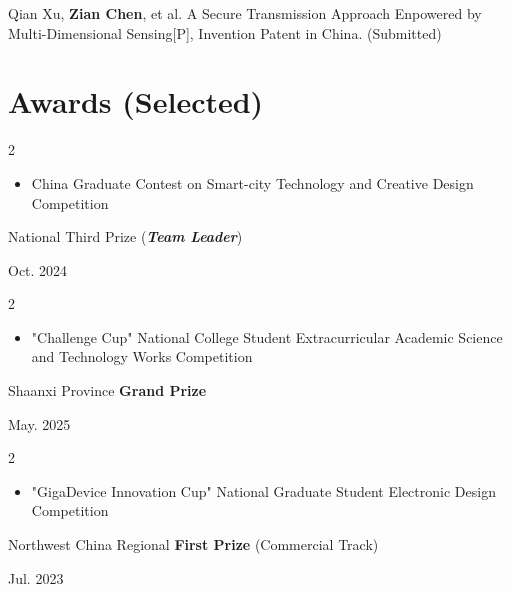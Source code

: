 \documentclass[10pt, letterpaper]{article}
\newenvironment{highlights}{
    \begin{itemize}[
        topsep=0.10 cm,
        parsep=0.10 cm,
        partopsep=0pt,
        itemsep=0pt,
        leftmargin=0 cm + 10pt
    ]
}{
    \end{itemize}
} %
\newenvironment{twocolentry}[2][]{
    \onecolentry
    \def\secondColumn{#2}
    \setcolumnwidth{\fill, 4.5 cm}
    \begin{paracol}{2}
}{
    \switchcolumn \raggedleft \secondColumn
    \end{paracol}
    \endonecolentry
} %
\begin{document}
        \begin{samepage}
            [$\rm{P_6}$] Qian Xu, \textbf{Zian Chen}, et al. A Secure Transmission Approach Enpowered by Multi-Dimensional Sensing[P], Invention Patent in China. (Submitted)
        \end{samepage}
        \vspace{0.10 cm}
        
    \section{Awards {\footnotesize{(Selected)}}}

        \begin{twocolentry}{
            Oct. 2024
        }
        \begin{highlights}
             \item China Graduate Contest on Smart-city Technology and Creative Design Competition
        \end{highlights}
        \item \hspace{0.75 cm} National Third Prize (\textbf{\textit{Team Leader}})
        \end{twocolentry}
        
        \vspace{0.20 cm} 

        \begin{twocolentry}{
            May. 2025
        }
        \begin{highlights}
             \item "Challenge Cup" National College Student Extracurricular Academic Science and Technology Works Competition
        \end{highlights}
        \item \hspace{0.75 cm} Shaanxi Province \textbf{Grand Prize}
        \end{twocolentry}
        
        \vspace{0.20 cm} 
        \begin{twocolentry}{
            Jul. 2023
        }
        \begin{highlights}
             \item "GigaDevice Innovation Cup" National Graduate Student Electronic Design Competition
        \end{highlights}
        \item \hspace{0.75 cm} Northwest China Regional \textbf{First Prize} (Commercial Track)
        \end{twocolentry}
        
\end{document}

